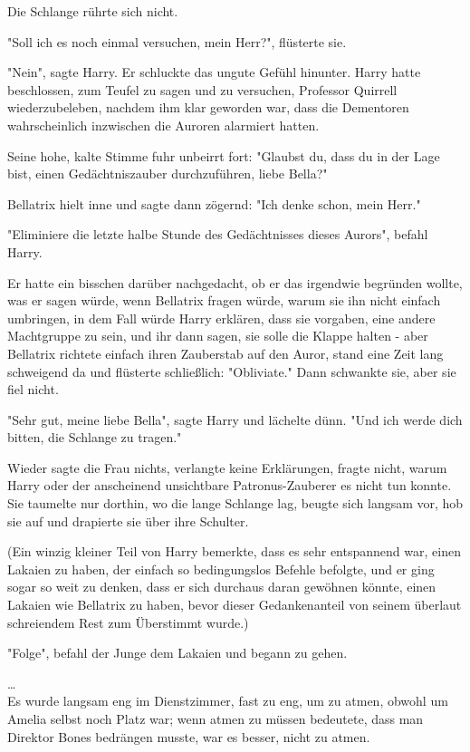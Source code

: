 {Die Schlange rührte sich nicht.

"Soll ich es noch einmal versuchen, mein Herr?", flüsterte sie.

"Nein", sagte Harry. Er schluckte das ungute Gefühl hinunter. Harry hatte beschlossen, zum Teufel zu sagen und zu versuchen, Professor Quirrell wiederzubeleben, nachdem ihm klar geworden war, dass die Dementoren wahrscheinlich inzwischen die Auroren alarmiert hatten.

Seine hohe, kalte Stimme fuhr unbeirrt fort: "Glaubst du, dass du in der Lage bist, einen Gedächtniszauber durchzuführen, liebe Bella?"

Bellatrix hielt inne und sagte dann zögernd: "Ich denke schon, mein Herr."

"Eliminiere die letzte halbe Stunde des Gedächtnisses dieses Aurors", befahl Harry.

Er hatte ein bisschen darüber nachgedacht, ob er das irgendwie begründen wollte, was er sagen würde, wenn Bellatrix fragen würde, warum sie ihn nicht einfach umbringen, in dem Fall würde Harry erklären, dass sie vorgaben, eine andere Machtgruppe zu sein, und ihr dann sagen, sie solle die Klappe halten - aber Bellatrix richtete einfach ihren Zauberstab auf den Auror, stand eine Zeit lang schweigend da und flüsterte schließlich: "Obliviate." Dann schwankte sie, aber sie fiel nicht.

"Sehr gut, meine liebe Bella", sagte Harry und lächelte dünn. "Und ich werde dich bitten, die Schlange zu tragen."

Wieder sagte die Frau nichts, verlangte keine Erklärungen, fragte nicht, warum Harry oder der anscheinend unsichtbare Patronus-Zauberer es nicht tun konnte. Sie taumelte nur dorthin, wo die lange Schlange lag, beugte sich langsam vor, hob sie auf und drapierte sie über ihre Schulter.

(Ein winzig kleiner Teil von Harry bemerkte, dass es sehr entspannend war, einen Lakaien zu haben, der einfach so bedingungslos Befehle befolgte, und er ging sogar so weit zu denken, dass er sich durchaus daran gewöhnen könnte, einen Lakaien wie Bellatrix zu haben, bevor dieser Gedankenanteil von seinem überlaut schreiendem Rest zum Überstimmt wurde.)

"Folge", befahl der Junge dem Lakaien und begann zu gehen.

…\\ Es wurde langsam eng im Dienstzimmer, fast zu eng, um zu atmen, obwohl um Amelia selbst noch Platz war; wenn atmen zu müssen bedeutete, dass man Direktor Bones bedrängen musste, war es besser, nicht zu atmen.

}
